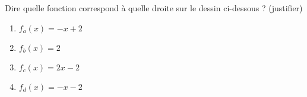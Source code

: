 
\begin{exercice}\label{exosmath-0679}

\let\Oldtheenumi\theenumi
\renewcommand{\theenumi}{(\alph{enumi})}
Dire quelle fonction correspond à quelle droite sur le dessin ci-dessous ? (justifier)
\begin{enumerate}
    \item
        \( f_a(x)=-x+2\)
    \item
        \( f_b(x)=2\)
    \item
        \( f_c(x)=2x-2\)
    \item
        \( f_d(x)=-x-2\)
\end{enumerate}

\let\theenumi\Oldtheenumi

\begin{center}
   
\end{center}

\end{exercice}

